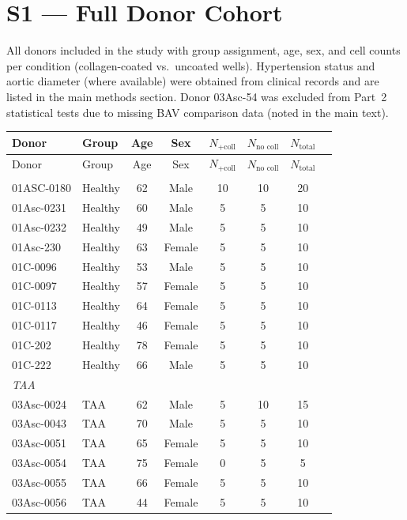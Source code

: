 \documentclass[11pt,a4paper]{article}
\begin{document}
\section*{S1 — Full Donor Cohort}
All donors included in the study with group assignment, age, sex, and cell counts
per condition (collagen-coated vs.\ uncoated wells). Hypertension status and aortic
diameter (where available) were obtained from clinical records and are listed in the
main methods section. Donor 03Asc-54 was excluded from Part~2 statistical tests
due to missing BAV comparison data (noted in the main text).
\vspace{1em}
\begin{longtable}{llcccccc}
\toprule
Donor & Group & Age & Sex & $N_{+\text{coll}}$ & $N_{\text{no coll}}$ & $N_{\text{total}}$ \\
\midrule
\endfirsthead
\toprule Donor & Group & Age & Sex & $N_{+\text{coll}}$ & $N_{\text{no coll}}$ & $N_{\text{total}}$ \\\midrule\endhead
\bottomrule\endfoot
\multicolumn{7}{l}{\textit{Healthy}} \\
  01ASC-0180 & Healthy & 62 & Male & 10 & 10 & 20 \\
  01Asc-0231 & Healthy & 60 & Male & 5 & 5 & 10 \\
  01Asc-0232 & Healthy & 49 & Male & 5 & 5 & 10 \\
  01Asc-230 & Healthy & 63 & Female & 5 & 5 & 10 \\
  01C-0096 & Healthy & 53 & Male & 5 & 5 & 10 \\
  01C-0097 & Healthy & 57 & Female & 5 & 5 & 10 \\
  01C-0113 & Healthy & 64 & Female & 5 & 5 & 10 \\
  01C-0117 & Healthy & 46 & Female & 5 & 5 & 10 \\
  01C-202 & Healthy & 78 & Female & 5 & 5 & 10 \\
  01C-222 & Healthy & 66 & Male & 5 & 5 & 10 \\
\midrule
\multicolumn{7}{l}{\textit{TAA}} \\
  03Asc-0024 & TAA & 62 & Male & 5 & 10 & 15 \\
  03Asc-0043 & TAA & 70 & Male & 5 & 5 & 10 \\
  03Asc-0051 & TAA & 65 & Female & 5 & 5 & 10 \\
  03Asc-0054 & TAA & 75 & Female & 0 & 5 & 5 \\
  03Asc-0055 & TAA & 66 & Female & 5 & 5 & 10 \\
  03Asc-0056 & TAA & 44 & Female & 5 & 5 & 10 \\

\end{longtable}
\end{document}
